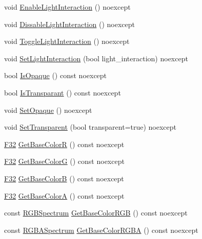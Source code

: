 \begin{DoxyCompactItemize}
void \hyperlink{structmage_1_1_material_abbcdcc3a9cb44c854212508c8419aa7f}{Enable\+Light\+Interaction} () noexcept
\item 
void \hyperlink{structmage_1_1_material_ab4b92a53ee74e401c518eea299fb4e0b}{Dissable\+Light\+Interaction} () noexcept
\item 
void \hyperlink{structmage_1_1_material_a9c8c15d426461b4a597b9a9947a7bd62}{Toggle\+Light\+Interaction} () noexcept
\item 
void \hyperlink{structmage_1_1_material_a9b0bcb448cf9c96bcb63dcbc0f110bd1}{Set\+Light\+Interaction} (bool light\+\_\+interaction) noexcept
\item 
bool \hyperlink{structmage_1_1_material_a0df1804c29bfd9d2bbc606d6285dccec}{Is\+Opaque} () const noexcept
\item 
bool \hyperlink{structmage_1_1_material_a6a62e3889887e77259070e1f9cd9150f}{Is\+Transparant} () const noexcept
\item 
void \hyperlink{structmage_1_1_material_ab3c49ab54603adebb1d08803fc700fc9}{Set\+Opaque} () noexcept
\item 
void \hyperlink{structmage_1_1_material_abf7e618017185ea05c72d050e89018fe}{Set\+Transparent} (bool transparent=true) noexcept
\item 
\hyperlink{namespacemage_aa97e833b45f06d60a0a9c4fc22ae02c0}{F32} \hyperlink{structmage_1_1_material_ae9b271a0557e61f4dfb926780ec591ef}{Get\+Base\+ColorR} () const noexcept
\item 
\hyperlink{namespacemage_aa97e833b45f06d60a0a9c4fc22ae02c0}{F32} \hyperlink{structmage_1_1_material_a74686fb74ca82f32d9e9ea6c30b182e5}{Get\+Base\+ColorG} () const noexcept
\item 
\hyperlink{namespacemage_aa97e833b45f06d60a0a9c4fc22ae02c0}{F32} \hyperlink{structmage_1_1_material_ac24c2c36e2ddcf1802ad44a6c45fb17d}{Get\+Base\+ColorB} () const noexcept
\item 
\hyperlink{namespacemage_aa97e833b45f06d60a0a9c4fc22ae02c0}{F32} \hyperlink{structmage_1_1_material_ad96a20683c2aa0f90d189066567d9cd4}{Get\+Base\+ColorA} () const noexcept
\item 
const \hyperlink{structmage_1_1_r_g_b_spectrum}{R\+G\+B\+Spectrum} \hyperlink{structmage_1_1_material_ab1922190e8759c458ade0dfac0da5805}{Get\+Base\+Color\+R\+GB} () const noexcept
\item 
const \hyperlink{structmage_1_1_r_g_b_a_spectrum}{R\+G\+B\+A\+Spectrum} \hyperlink{structmage_1_1_material_ac79470bc12929841786bcc41fdd209d9}{Get\+Base\+Color\+R\+G\+BA} () const noexcept
\item 

\end{DoxyCompactItemize}
